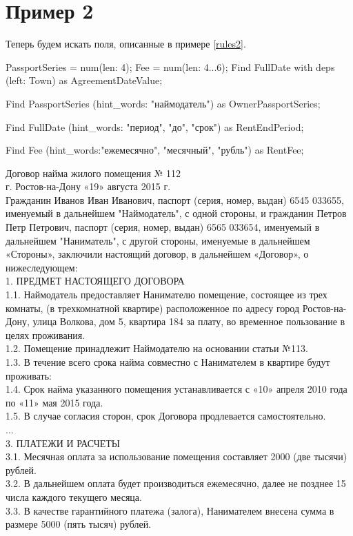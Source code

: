 \section{Пример 2}
Теперь будем искать поля, описанные в примере \ref{rules2}.
\begin{myexample}
\label{rules2}
\begin{Verb}
PassportSeries = num(len: 4);
Fee = num(len: 4...6);
Find FullDate with deps (left: Town) 
as AgreementDateValue;

Find PassportSeries (hint\_words: "наймодатель") 
as OwnerPassportSeries;

Find FullDate (hint\_words: "период", "до", "срок") 
as RentEndPeriod;

Find Fee (hint\_words:"ежемесячно", "месячный", "рубль") 
as RentFee;
\end{Verb}
\end{myexample}

\begin{myexample}
\label{agr12}
Договор найма жилого помещения № 112\\
г. Ростов-на-Дону «19» августа 2015 г.\\ 
Гражданин Иванов Иван Иванович, паспорт (серия, номер, выдан) 6545 033655, именуемый в дальнейшем "Наймодатель", с одной стороны, и гражданин Петров Петр Петрович, паспорт (серия, номер, выдан) 6565 033654, именуемый в дальнейшем "Наниматель", с другой стороны, именуемые в дальнейшем «Стороны», заключили настоящий договор, в дальнейшем «Договор», о нижеследующем: \\
1. ПРЕДМЕТ НАСТОЯЩЕГО ДОГОВОРА\\
1.1. Наймодатель предоставляет Нанимателю помещение, состоящее из трех комнаты, (в трехкомнатной квартире) расположенное по адресу город Ростов-на-Дону, улица Волкова, дом 5, квартира 184 за плату, во временное пользование в целях проживания. \\
1.2. Помещение принадлежит Наймодателю на основании статьи №113.\\
1.3. В течение всего срока найма совместно с Нанимателем в квартире будут проживать:\\
1.4. Срок найма указанного помещения устанавливается с «10» апреля 2010 года по «11» мая 2015 года.\\
1.5. В случае согласия сторон, срок Договора продлевается самостоятельно. \\
...\\
3. ПЛАТЕЖИ И РАСЧЕТЫ\\
3.1. Месячная оплата за использование помещения составляет 2000 (две тысячи) рублей.\\
3.2. В дальнейшем оплата будет производиться ежемесячно, далее не позднее 15 числа каждого текущего месяца.\\ 
3.3. В качестве гарантийного платежа (залога), Нанимателем внесена сумма в размере 5000 (пять тысяч) рублей.\\
\end{myexample}

